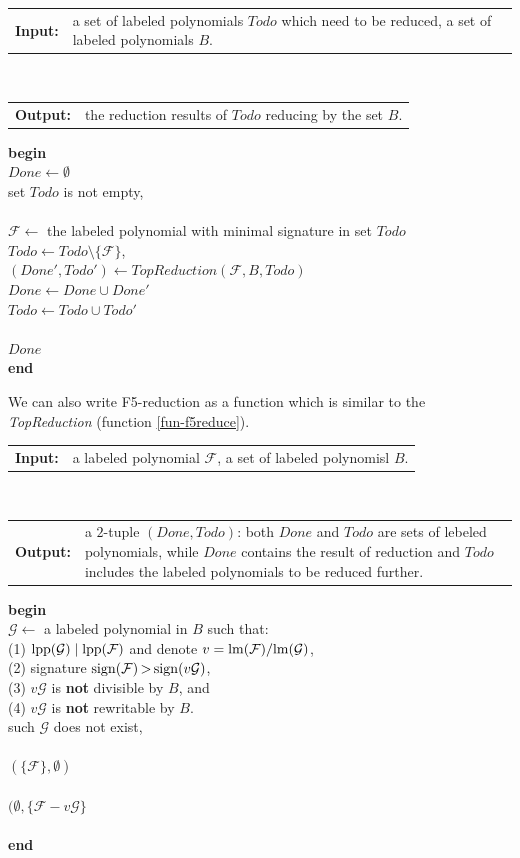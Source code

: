 \documentclass[preprint,authoryear,3p,12pt]{elsarticle}
\makeatletter
\newcommand{\Input}[1]
  {\noindent\begin{tabular}{@{}p{1.8cm}@{}p{13.2cm}@{}}
   {\bf Input: }&#1 \end{tabular}}
\newcommand{\Output}[1]
  {\noindent\begin{tabular}{@{}p{1.8cm}@{}p{13.2cm}@{}}
   {\bf Output: }&#1 \end{tabular}}
\def\lm{{\rm lm}}
\def\lpp{{\rm lpp}}
\def\sus{{\,>\,}}
\def\s{{\rm{sign}}}
\def\lif{{\bf if \,}}
\def\lthen{{\bf then \,}}
\def\lelse{{\bf else \,}}
\def\lendif{{\bf end if\,}}
\def\lwhile{{\bf while \,}}
\def\lendwhile{{\bf end while\,}}
\def\ldo{{\bf do \,}}
\def\lend{{\bf end \,}}
\def\lreturn{{\bf return \,}}
\def\lla{{\longleftarrow}}
\def\lbegin{{\bf begin}}
\newcommand{\SPC}{\hspace*{15pt}}
\makeatother
\begin{document}
\begin{function} \caption{\bf --- Reduction} \label{fun-reduce}
  \smallskip
  \Input{a set of labeled polynomials $Todo$ which need to be reduced, a set of labeled polynomials $B$.}\\
  \Output{the reduction results of $Todo$ reducing by the set $B$.}
  \medskip

  \noindent
  \lbegin\\
  \SPC $Done \lla \emptyset$\\
  \SPC \lwhile set $Todo$ is not empty, \\
  \SPC\SPC \ldo \\
  \SPC\SPC\SPC ${\mathcal F} \lla $ the labeled polynomial with minimal signature in set $Todo$\\
  \SPC\SPC\SPC $Todo \lla Todo \setminus \{{\mathcal F}\}$,\\
  \SPC\SPC\SPC $(Done', Todo') \lla TopReduction({\mathcal F}, B,Todo)$\\
  \SPC\SPC\SPC $Done \lla Done \cup Done'$\\
  \SPC\SPC\SPC $Todo \lla Todo \cup Todo'$\\
  \SPC \lendwhile\\
  \SPC \lreturn $Done$\\
  \lend
  \medskip
\end{function}

We can also write  F5-reduction as a function which is similar to the {\em TopReduction} (function \ref{fun-f5reduce}).

\begin{function} \caption{\bf --- F5-Reduction} \label{fun-f5reduce}
  \smallskip
  \Input{a labeled polynomial ${\mathcal F}$, a set of labeled polynomisl $B$.}\\
  \Output{a $2$-tuple $(Done, Todo)$: both $Done$ and $Todo$ are sets of lebeled polynomials,
  while $Done$ contains the result of reduction and $Todo$
  includes the labeled polynomials to be reduced further.}
  \medskip

  \noindent
  \lbegin\\
  \SPC ${\mathcal G} \lla $ a labeled polynomial in $B$ such
  that: \\
  \SPC\SPC\SPC\SPC (1) $\lpp({\mathcal G}) \mid \lpp({\mathcal F})$ and denote $v=\lm({\mathcal F})/\lm({\mathcal
  G})$, \\
  \SPC\SPC\SPC\SPC (2) signature $\s({\mathcal F}) \sus \s(v{\mathcal
  G})$,\\
  \SPC\SPC\SPC\SPC (3) $v{\mathcal G}$ is {\bf not} divisible by
  $B$, and \\
  \SPC\SPC\SPC\SPC (4) $v{\mathcal G}$ is {\bf not} rewritable by $B$. \\
  \SPC  \lif such ${\mathcal G}$ does not exist, \\
  \SPC\SPC \lthen \\
  \SPC\SPC\SPC \lreturn $(\{{\mathcal F}\}, \emptyset)$\\
  \SPC\SPC \lelse \\
  \SPC\SPC\SPC \lreturn $(\emptyset, \{{\mathcal F}-v{\mathcal
  G}\}$\\
  \SPC \lendif\\
  \lend
  \medskip
\end{function}
\end{document}
